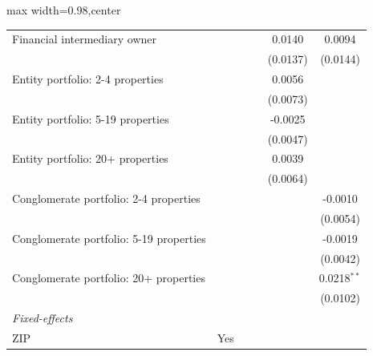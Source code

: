 \begin{table}[htbp]
\begin{adjustbox}{max width=0.98\textwidth,center}
\begin{tabular}{lccccc}
         Financial intermediary owner            &                &                &                & 0.0140          & 0.0094\\   
                                                 &                &                &                & (0.0137)        & (0.0144)\\   
         Entity portfolio: 2-4 properties        &                &                &                & 0.0056          &   \\   
                                                 &                &                &                & (0.0073)        &   \\   
         Entity portfolio: 5-19 properties       &                &                &                & -0.0025         &   \\   
                                                 &                &                &                & (0.0047)        &   \\   
         Entity portfolio: 20+ properties        &                &                &                & 0.0039          &   \\   
                                                 &                &                &                & (0.0064)        &   \\   
         Conglomerate portfolio: 2-4 properties  &                &                &                &                 & -0.0010\\   
                                                 &                &                &                &                 & (0.0054)\\   
         Conglomerate portfolio: 5-19 properties &                &                &                &                 & -0.0019\\   
                                                 &                &                &                &                 & (0.0042)\\   
         Conglomerate portfolio: 20+ properties  &                &                &                &                 & 0.0218$^{**}$\\   
                                                 &                &                &                &                 & (0.0102)\\   
         \midrule
         \emph{Fixed-effects}\\
         ZIP                                     & Yes            &                &                &                 & \\  

\end{tabular}
\end{adjustbox}
\end{table}
